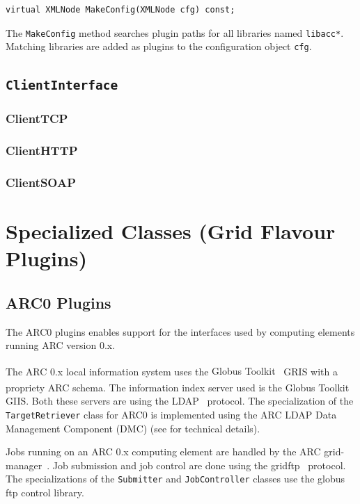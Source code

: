 \documentclass{book}
\newcommand{\GT}{Globus Toolkit\textsuperscript{\textregistered}}
\newcommand{\TargetRetriever}{\texttt{TargetRetriever}}
\newcommand{\Submitter}{\texttt{Submitter}}
\newcommand{\JobController}{\texttt{JobController}}
\newcommand{\ClientInterface}{\texttt{ClientInterface}}
\begin{document}
\begin{shaded}
\begin{verbatim}
virtual XMLNode MakeConfig(XMLNode cfg) const;
\end{verbatim}
\end{shaded}

The \texttt{MakeConfig} method searches plugin paths for all libraries named \texttt{libacc*}. Matching 
libraries are added as plugins to the configuration object \texttt{cfg}.

\subsection{{\ClientInterface}}
\subsubsection{ClientTCP}
\subsubsection{ClientHTTP}
\subsubsection{ClientSOAP}

\section{Specialized Classes (Grid Flavour Plugins)}
\label{sec:plugins}
\subsection{ARC0 Plugins}
The ARC0 plugins enables support for the interfaces used by computing
elements running ARC version 0.x.

The ARC 0.x local information system uses the {\GT}~\cite{globus} GRIS with a
propriety ARC schema. The information index server used is the {\GT}
GIIS. Both these servers are using the LDAP~\cite{ldap} protocol. The
specialization of the {\TargetRetriever} class for ARC0 is implemented
using the ARC LDAP Data Management Component (DMC) (see \cite{hed} for 
technical details).

Jobs running on an ARC 0.x computing element are handled by the ARC
grid-manager~\cite{gm}. Job submission and job control are done using the
gridftp~\cite{gridftp} protocol. The specializations of the {\Submitter} and
{\JobController} classes use the globus ftp control library.
\end{document}

